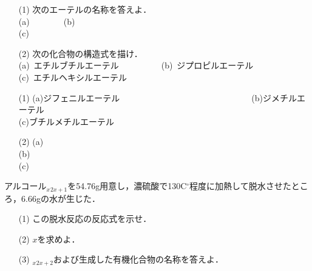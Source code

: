 \documentclass[a4paper,12pt]{ltjsreport}
\begin{document}
  \newpage
        \begin{que}
        \begin{itemize}
            \item [(1)]次のエーテルの名称を答えよ．\\
            
            \noindent(a)~~~~~~~~(b)~\\[5pt]
            (c)~\\
            \item [(2)]次の化合物の構造式を描け．\\
            (a)~エチルブチルエーテル~~~~~~~~~~(b)~ジプロピルエーテル~~\\
            (c)~エチルヘキシルエーテル
        \end{itemize}
        \end{que}
        \ans
        \begin{itemize}
            \item [(1)](a)ジフェニルエーテル~~~~~~~~~~~~~~~~~~~~~~~~~~~~~~~(b)ジメチルエーテル~~~~~~~~~~~~~~~~~\\[15pt]
            (c)ブチルメチルエーテル\\[10pt]
            \item[(2)](a)\\[70pt]
            (b)\\[70pt]

            (c)
        \end{itemize}
        \newpage
        \begin{que}
        アルコール$_{x}$$_{2x+1}$を54.76g用意し，濃硫酸で130C$^\circ$程度に加熱して脱水させたところ，$6.66$gの水が生じた．
      \begin{itemize}
        \item [(1)]この脱水反応の反応式を示せ．
        \item [(2)]$x$を求めよ．
        \item [(3)]$_{x}$$_{2x+2}$および生成した有機化合物の名称を答えよ．
      \end{itemize}
        \end{que}
        \ans
\end{document}
